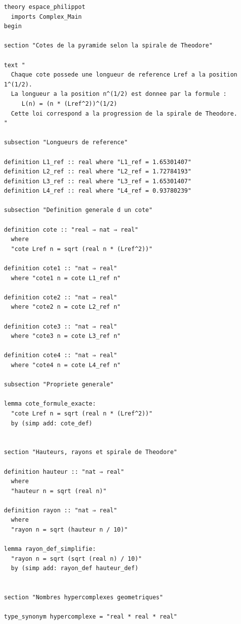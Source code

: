 \documentclass[12pt]{article}
\begin{document}
\begin{tcolorbox}[
  colback=gray!10,
  colframe=gray!50,
  arc=2mm,
  boxrule=0.5pt,
  left=4pt,
  right=4pt,
  top=6pt,
  bottom=6pt,
  enhanced
]
\begin{verbatim}
theory espace_philippot
  imports Complex_Main
begin

section "Cotes de la pyramide selon la spirale de Theodore"

text "
  Chaque cote possede une longueur de reference Lref a la position 1^(1/2).
  La longueur a la position n^(1/2) est donnee par la formule :
     L(n) = (n * (Lref^2))^(1/2)
  Cette loi correspond a la progression de la spirale de Theodore.
"

subsection "Longueurs de reference"

definition L1_ref :: real where "L1_ref = 1.65301407"
definition L2_ref :: real where "L2_ref = 1.72784193"
definition L3_ref :: real where "L3_ref = 1.65301407"
definition L4_ref :: real where "L4_ref = 0.93780239"

subsection "Definition generale d un cote"

definition cote :: "real ⇒ nat ⇒ real"
  where
  "cote Lref n = sqrt (real n * (Lref^2))"

definition cote1 :: "nat ⇒ real"
  where "cote1 n = cote L1_ref n"

definition cote2 :: "nat ⇒ real"
  where "cote2 n = cote L2_ref n"

definition cote3 :: "nat ⇒ real"
  where "cote3 n = cote L3_ref n"

definition cote4 :: "nat ⇒ real"
  where "cote4 n = cote L4_ref n"

subsection "Propriete generale"

lemma cote_formule_exacte:
  "cote Lref n = sqrt (real n * (Lref^2))"
  by (simp add: cote_def)


section "Hauteurs, rayons et spirale de Theodore"

definition hauteur :: "nat ⇒ real"
  where
  "hauteur n = sqrt (real n)"

definition rayon :: "nat ⇒ real"
  where
  "rayon n = sqrt (hauteur n / 10)"

lemma rayon_def_simplifie:
  "rayon n = sqrt (sqrt (real n) / 10)"
  by (simp add: rayon_def hauteur_def)


section "Nombres hypercomplexes geometriques"

type_synonym hypercomplexe = "real * real * real"


\end{verbatim}
\end{tcolorbox}
\end{document}
